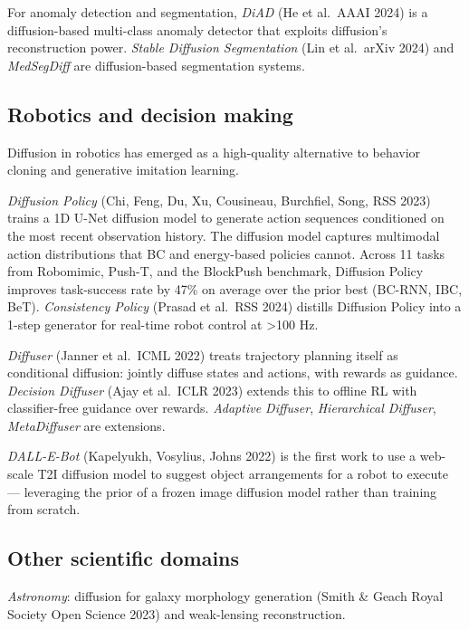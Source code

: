 For anomaly detection and segmentation, \emph{DiAD} (He et al.~AAAI 2024) is a diffusion-based multi-class anomaly detector that exploits diffusion's reconstruction power. \emph{Stable Diffusion Segmentation} (Lin et al.~arXiv 2024) and \emph{MedSegDiff} are diffusion-based segmentation systems.

\subsection{Robotics and decision making}\label{robotics-and-decision-making}

Diffusion in robotics has emerged as a high-quality alternative to behavior cloning and generative imitation learning.

\emph{Diffusion Policy} (Chi, Feng, Du, Xu, Cousineau, Burchfiel, Song, RSS 2023) trains a 1D U-Net diffusion model to generate action sequences conditioned on the most recent observation history. The diffusion model captures multimodal action distributions that BC and energy-based policies cannot. Across 11 tasks from Robomimic, Push-T, and the BlockPush benchmark, Diffusion Policy improves task-success rate by 47\% on average over the prior best (BC-RNN, IBC, BeT). \emph{Consistency Policy} (Prasad et al.~RSS 2024) distills Diffusion Policy into a 1-step generator for real-time robot control at \textgreater100 Hz.

\emph{Diffuser} (Janner et al.~ICML 2022) treats trajectory planning itself as conditional diffusion: jointly diffuse states and actions, with rewards as guidance. \emph{Decision Diffuser} (Ajay et al.~ICLR 2023) extends this to offline RL with classifier-free guidance over rewards. \emph{Adaptive Diffuser}, \emph{Hierarchical Diffuser}, \emph{MetaDiffuser} are extensions.

\emph{DALL-E-Bot} (Kapelyukh, Vosylius, Johns 2022) is the first work to use a web-scale T2I diffusion model to suggest object arrangements for a robot to execute --- leveraging the prior of a frozen image diffusion model rather than training from scratch.

\subsection{Other scientific domains}\label{other-scientific-domains}

\emph{Astronomy}: diffusion for galaxy morphology generation (Smith \& Geach Royal Society Open Science 2023) and weak-lensing reconstruction.


